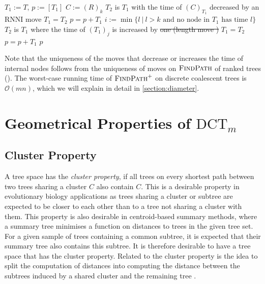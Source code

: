 \documentclass[11pt]{amsart}
\newcommand{\rnni}{\mathrm{RNNI}}
\newcommand{\findpath}{\textsc{FindPath}}
\newcommand{\ntime}{\mathrm{time}}
\newcommand{\dct}{\mathrm{DCT}}
\renewcommand{\O}{\mathcal O}
\newcommand{\summary}[1]{} %
\providecommand{\DIFaddtex}[1]{{\protect\color{blue}\uwave{#1}}} %
\providecommand{\DIFdeltex}[1]{{\protect\color{red}\sout{#1}}}                      %
\providecommand{\DIFaddbegin}{} %
\providecommand{\DIFaddend}{} %
\providecommand{\DIFdelbegin}{} %
\providecommand{\DIFdelend}{} %
\providecommand{\DIFadd}[1]{\texorpdfstring{\DIFaddtex{#1}}{#1}} %
\providecommand{\DIFdel}[1]{\texorpdfstring{\DIFdeltex{#1}}{}} %
\newcommand{\DIFscaledelfig}{0.5}
\newlength{\DIFdelgraphicswidth} %
\newlength{\DIFdelgraphicsheight} %
\newcommand{\DIFaddincludegraphics}[2][]{{\color{blue}\fbox{\DIFOincludegraphics[#1]{#2}}}} %
\newcommand{\DIFdelincludegraphics}[2][]{%
\sbox{\DIFdelgraphicsbox}{\DIFOincludegraphics[#1]{#2}}%
\settoboxwidth{\DIFdelgraphicswidth}{\DIFdelgraphicsbox} %
\settoboxtotalheight{\DIFdelgraphicsheight}{\DIFdelgraphicsbox} %
\scalebox{\DIFscaledelfig}{%
\parbox[b]{\DIFdelgraphicswidth}{\usebox{\DIFdelgraphicsbox}\\[-\baselineskip] \rule{\DIFdelgraphicswidth}{0em}}\llap{\resizebox{\DIFdelgraphicswidth}{\DIFdelgraphicsheight}{%
\setlength{\unitlength}{\DIFdelgraphicswidth}%
\begin{picture}(1,1)%
\thicklines\linethickness{2pt} %
{\color[rgb]{1,0,0}\put(0,0){\framebox(1,1){}}}%
{\color[rgb]{1,0,0}\put(0,0){\line( 1,1){1}}}%
{\color[rgb]{1,0,0}\put(0,1){\line(1,-1){1}}}%
\end{picture}%
}\hspace*{3pt}}} %
} %
\DeclareRobustCommand{\DIFaddbegin}{\DIFOaddbegin \let\includegraphics\DIFaddincludegraphics} %
\DeclareRobustCommand{\DIFaddend}{\DIFOaddend \let\includegraphics\DIFOincludegraphics} %
\DeclareRobustCommand{\DIFdelbegin}{\DIFOdelbegin \let\includegraphics\DIFdelincludegraphics} %
\DeclareRobustCommand{\DIFdelend}{\DIFOaddend \let\includegraphics\DIFOincludegraphics} %
\begin{document}
\begin{algorithm}[h]
	\caption{$\findpath^+$($T,R$)}
	\begin{algorithmic}[1]
		\label{alg:fp_dtt}
		\STATE $T_1 := T$, $p := [T_1]$
		 \label{alg:fp_dtt:for}
			\STATE $C:=(R)_k$
			\WHILE {$\ntime((C)_{T_1})>k$} \label{alg:fp_dtt:while}
					\STATE $T_2$ is $T_1$ with the time of $(C)_{T_1}$ decreased by an $\rnni$ move
				\STATE $T_1 = T_2$
				\STATE $p = p+T_1$
			\ENDWHILE
				\STATE $i := \min\{l \ |\  l>k \text{ and no node in } T_1 \text{ has time }l\}$ \label{line:min_free_time}
				 \label{alg:fp_dtt:nested_for}
					\label{line:length_move}
					\STATE $T_2$ is $T_1$ where the time of $(T_1)_j$ is increased by \DIFdelbegin \DIFdel{one (length move
					)
					}\DIFdelend \DIFaddbegin \DIFadd{a length move
					}\DIFaddend \STATE $T_1 = T_2$
					\STATE $p = p+T_1$
				\ENDFOR
			\ENDIF
		\ENDFOR
		\RETURN $p$
	\end{algorithmic}
\end{algorithm}

Note that the uniqueness of the moves that decrease or increases the time of internal nodes follows from the uniqueness of moves on $\findpath$ of ranked trees (\autocite[Proposition 1]{Collienne2021}).
The worst-case running time of $\findpath^+$ on discrete coalescent trees is $\O(mn)$, which we will explain in detail in \autoref{section:diameter}.


\section{Geometrical Properties of $\dct_m$}
\label{section:geometry}

\subsection{Cluster Property}
\label{section:cluster_property}
\summary{Definition of Cluster Property and why it is relevant (a bit of bio).}
A tree space has the \emph{cluster property}, if all trees on every shortest path between two trees sharing a cluster $C$ also contain $C$.
This is a desirable property in evolutionary biology applications as trees sharing a cluster or subtree are expected to be closer to each other than to a tree not sharing a cluster with them.
This property is also desirable in centroid-based summary methods, where a summary tree minimises a function on distances to trees in the given tree set.
For a given sample of trees containing a common subtree, it is expected that their summary tree also contains this subtree.
It is therefore desirable to have a tree space that has the cluster property.
Related to the cluster property is the idea to split the computation of distances into computing the distance between the subtrees induced by a shared cluster and the remaining tree \autocite{Bordewich2005-nx}.
\end{document}
